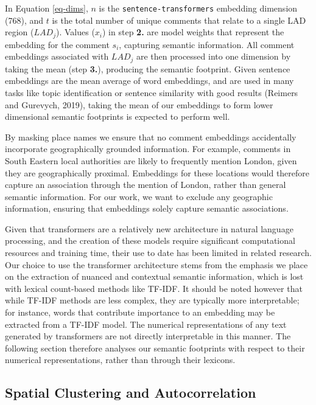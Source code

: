 \documentclass[
  letterpaper,
  11pt,
  english,
  onehalfspacing,
  headsepline]{MastersDoctoralThesis}
\begin{document}
In Equation \ref{eq-dims}, \(n\) is the \texttt{sentence-transformers}
embedding dimension (768), and \(t\) is the total number of unique
comments that relate to a single LAD region (\(LAD_j\)). Values
(\(x_i\)) in step \textbf{2.} are model weights that represent the
embedding for the comment \(s_i\), capturing semantic information. All
comment embeddings associated with \(LAD_j\) are then processed into one
dimension by taking the mean (step \textbf{3.}), producing the semantic
footprint. Given sentence embeddings are the mean average of word
embeddings, and are used in many tasks like topic identification or
sentence similarity with good results (Reimers and Gurevych, 2019),
taking the mean of our embeddings to form lower dimensional semantic
footprints is expected to perform well.

By masking place names we ensure that no comment embeddings accidentally
incorporate geographically grounded information. For example, comments
in South Eastern local authorities are likely to frequently mention
London, given they are geographically proximal. Embeddings for these
locations would therefore capture an association through the mention of
London, rather than general semantic information. For our work, we want
to exclude any geographic information, ensuring that embeddings solely
capture semantic associations.

Given that transformers are a relatively new architecture in natural
language processing, and the creation of these models require
significant computational resources and training time, their use to date
has been limited in related research. Our choice to use the transformer
architecture stems from the emphasis we place on the extraction of
nuanced and contextual semantic information, which is lost with lexical
count-based methods like TF-IDF. It should be noted however that while
TF-IDF methods are less complex, they are typically more interpretable;
for instance, words that contribute importance to an embedding may be
extracted from a TF-IDF model. The numerical representations of any text
generated by transformers are not directly interpretable in this manner.
The following section therefore analyses our semantic footprints with
respect to their numerical representations, rather than through their
lexicons.

\hypertarget{spatial-clustering-and-autocorrelation}{%
\subsection{Spatial Clustering and
Autocorrelation}\label{spatial-clustering-and-autocorrelation}}
\end{document}

